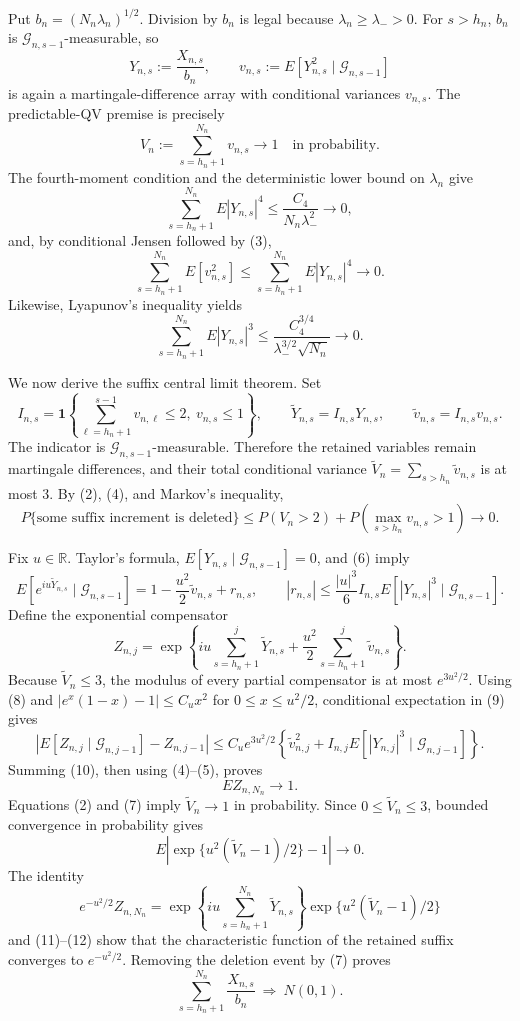 Put \(b_n=(N_n\lambda_n)^{1/2}\).  Division by \(b_n\) is legal because \(\lambda_n\ge\lambda_->0\).  For \(s>h_n\), \(b_n\) is \(\mathcal G_{n,s-1}\)-measurable, so
\[
Y_{n,s}:=\frac{X_{n,s}}{b_n},\qquad
v_{n,s}:=E[Y_{n,s}^2\mid\mathcal G_{n,s-1}]
\tag{1}
\]
is again a martingale-difference array with conditional variances \(v_{n,s}\).  The predictable-QV premise is precisely
\[
V_n:=\sum_{s=h_n+1}^{N_n}v_{n,s}\longrightarrow1
\quad\text{in probability}.
\tag{2}
\]
The fourth-moment condition and the deterministic lower bound on \(\lambda_n\) give
\[
\sum_{s=h_n+1}^{N_n}E|Y_{n,s}|^4
\le\frac{C_4}{N_n\lambda_-^2}\longrightarrow0,
\tag{3}
\]
and, by conditional Jensen followed by (3),
\[
\sum_{s=h_n+1}^{N_n}E[v_{n,s}^2]
\le\sum_{s=h_n+1}^{N_n}E|Y_{n,s}|^4\longrightarrow0.
\tag{4}
\]
Likewise, Lyapunov's inequality yields
\[
\sum_{s=h_n+1}^{N_n}E|Y_{n,s}|^3
\le\frac{C_4^{3/4}}{\lambda_-^{3/2}\sqrt{N_n}}\longrightarrow0.
\tag{5}
\]

We now derive the suffix central limit theorem.  Set
\[
I_{n,s}=\mathbf1\left\{\sum_{\ell=h_n+1}^{s-1}v_{n,\ell}\le2,\ v_{n,s}\le1\right\},\qquad
\widetilde Y_{n,s}=I_{n,s}Y_{n,s},\qquad
\widetilde v_{n,s}=I_{n,s}v_{n,s}.
\tag{6}
\]
The indicator is \(\mathcal G_{n,s-1}\)-measurable.  Therefore the retained variables remain martingale differences, and their total conditional variance \(\widetilde V_n=\sum_{s>h_n}\widetilde v_{n,s}\) is at most \(3\).  By (2), (4), and Markov's inequality,
\[
P\{\text{some suffix increment is deleted}\}
\le P(V_n>2)+P\!\left(\max_{s>h_n}v_{n,s}>1\right)\longrightarrow0.
\tag{7}
\]

Fix \(u\in\mathbb R\).  Taylor's formula, \(E[Y_{n,s}\mid\mathcal G_{n,s-1}]=0\), and (6) imply
\[
E[e^{iu\widetilde Y_{n,s}}\mid\mathcal G_{n,s-1}]
=1-\frac{u^2}{2}\widetilde v_{n,s}+r_{n,s},\qquad
|r_{n,s}|\le\frac{|u|^3}{6}I_{n,s}E[|Y_{n,s}|^3\mid\mathcal G_{n,s-1}].
\tag{8}
\]
Define the exponential compensator
\[
Z_{n,j}=\exp\left\{iu\sum_{s=h_n+1}^{j}\widetilde Y_{n,s}
+\frac{u^2}{2}\sum_{s=h_n+1}^{j}\widetilde v_{n,s}\right\}.
\tag{9}
\]
Because \(\widetilde V_n\le3\), the modulus of every partial compensator is at most \(e^{3u^2/2}\).  Using (8) and \(|e^x(1-x)-1|\le C_u x^2\) for \(0\le x\le u^2/2\), conditional expectation in (9) gives
\[
\left|E[Z_{n,j}\mid\mathcal G_{n,j-1}]-Z_{n,j-1}\right|
\le C_u e^{3u^2/2}\left\{\widetilde v_{n,j}^2
+I_{n,j}E[|Y_{n,j}|^3\mid\mathcal G_{n,j-1}]\right\}.
\tag{10}
\]
Summing (10), then using (4)--(5), proves
\[
E Z_{n,N_n}\longrightarrow1.
\tag{11}
\]
Equations (2) and (7) imply \(\widetilde V_n\to1\) in probability.  Since \(0\le\widetilde V_n\le3\), bounded convergence in probability gives
\[
E\left|\exp\{u^2(\widetilde V_n-1)/2\}-1\right|\longrightarrow0.
\tag{12}
\]
The identity
\[
e^{-u^2/2}Z_{n,N_n}
=\exp\left\{iu\sum_{s=h_n+1}^{N_n}\widetilde Y_{n,s}\right\}
\exp\{u^2(\widetilde V_n-1)/2\}
\tag{13}
\]
and (11)--(12) show that the characteristic function of the retained suffix converges to \(e^{-u^2/2}\).  Removing the deletion event by (7) proves
\[
\sum_{s=h_n+1}^{N_n}\frac{X_{n,s}}{b_n}\ \Rightarrow\ N(0,1).
\tag{14}
\]


